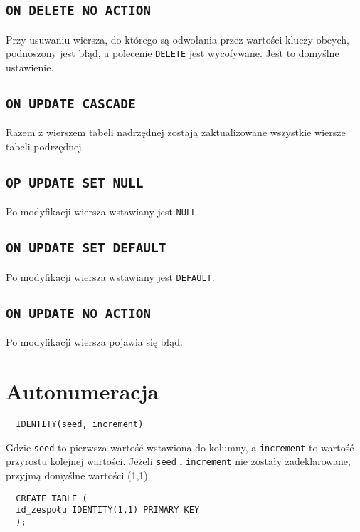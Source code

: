 \documentclass{article}
\begin{document}
\subsection{\tt ON DELETE NO ACTION}

Przy usuwaniu wiersza, do którego są odwołania przez wartości kluczy obcych, podnoszony jest błąd, a polecenie \texttt{DELETE} jest wycofywane. Jest to domyślne ustawienie.

\subsection{\tt ON UPDATE CASCADE}

Razem z wierszem tabeli nadrzędnej zostają zaktualizowane wszystkie wiersze tabeli podrzędnej.

\subsection{\tt OP UPDATE SET NULL}

Po modyfikacji wiersza wstawiany jest \texttt{NULL}.

\subsection{\tt ON UPDATE SET DEFAULT}

Po modyfikacji wiersza wstawiany jest \texttt{DEFAULT}.

\subsection{\tt ON UPDATE NO ACTION}

Po modyfikacji wiersza pojawia się błąd.

\section{Autonumeracja}

\begin{verbatim}
  IDENTITY(seed, increment)
\end{verbatim}

Gdzie {\tt seed} to pierwsza wartość wstawiona do kolumny, a {\tt increment} to wartość przyrostu kolejnej wartości.
Jeżeli {\tt seed} i {\tt increment} nie zostały zadeklarowane, przyjmą domyślne wartości (1,1).

\begin{verbatim}
  CREATE TABLE (
  id_zespołu IDENTITY(1,1) PRIMARY KEY
  );
\end{verbatim}
\end{document}

